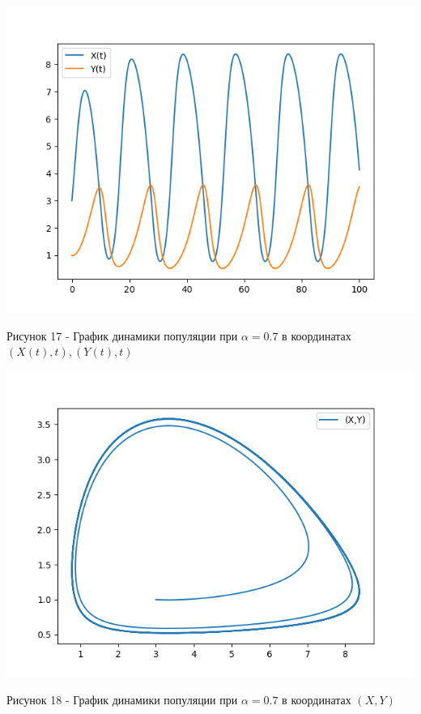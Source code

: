 \documentclass[a4paper,14pt]{extreport}
\begin{document}
\begin{center}
    \begin{minipage}[htb]{0.8\linewidth}
    \includegraphics[width=14cm]{n11.png}
    \end{minipage}
    \end{center}
    \begin{center}
        Рисунок 17 - График динамики популяции при $\alpha = 0.7$ в координатах $(X(t),t),(Y(t),t)$
    \end{center}
    \begin{center}
    \begin{minipage}[htb]{0.8\linewidth}
    \includegraphics[width=14cm]{11.png}
    \end{minipage}
    \end{center}
    \begin{center}
        Рисунок 18 - График динамики популяции при $\alpha = 0.7$ в координатах $(X,Y)$  
    \end{center}
\end{document}
